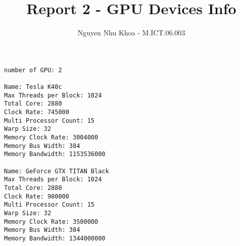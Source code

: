 \documentclass[a4paper,11pt, notitlepage]{article}
\begin{document}
\title{
\vspace{-3cm}
Report 2 - GPU Devices Info}
\author{Nguyen Nhu Khoa - M.ICT.06.003}
\maketitle

\pagestyle{plain}
\setcounter{page}{1}

\vspace{-1cm}
\noindent

\begin{verbatim}
number of GPU: 2

Name: Tesla K40c
Max Threads per Block: 1024
Total Core: 2880
Clock Rate: 745000
Multi Processor Count: 15
Warp Size: 32
Memory Clock Rate: 3004000
Memory Bus Width: 384
Memory Bandwidth: 1153536000

Name: GeForce GTX TITAN Black
Max Threads per Block: 1024
Total Core: 2880
Clock Rate: 980000
Multi Processor Count: 15
Warp Size: 32
Memory Clock Rate: 3500000
Memory Bus Width: 384
Memory Bandwidth: 1344000000
\end{verbatim}
\end{document}
